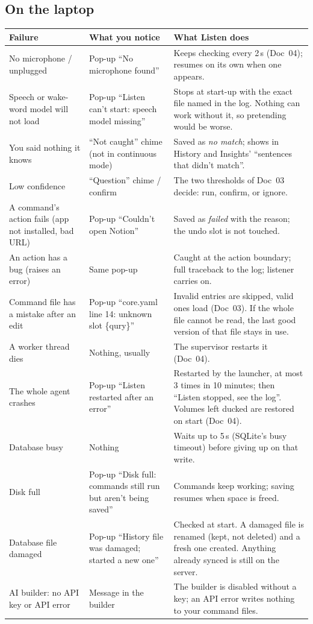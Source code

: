 \documentclass[11pt,a4paper]{article}
\begin{document}
\subsection{On the laptop}
\begin{center}
\small
\renewcommand{\arraystretch}{1.2}
\begin{tabularx}{\textwidth}{>{\raggedright\arraybackslash}p{3.3cm} >{\raggedright\arraybackslash}X >{\raggedright\arraybackslash}X}
\toprule
\textbf{Failure} & \textbf{What you notice} & \textbf{What Listen does} \\
\midrule
No microphone / unplugged & Pop-up ``No microphone found'' & Keeps checking every 2\,s (Doc~04); resumes on its own when one appears. \\
Speech or wake-word model will not load & Pop-up ``Listen can't start: speech model missing'' & Stops at start-up with the exact file named in the log. Nothing can work without it, so pretending would be worse. \\
You said nothing it knows & ``Not caught'' chime (not in continuous mode) & Saved as \emph{no match}; shows in History and Insights' ``sentences that didn't match''. \\
Low confidence & ``Question'' chime / confirm & The two thresholds of Doc~03 decide: run, confirm, or ignore. \\
A command's action fails (app not installed, bad URL) & Pop-up ``Couldn't open Notion'' & Saved as \emph{failed} with the reason; the undo slot is not touched. \\
An action has a bug (raises an error) & Same pop-up & Caught at the action boundary; full traceback to the log; listener carries on. \\
Command file has a mistake after an edit & Pop-up ``core.yaml line 14: unknown slot \{qury\}'' & Invalid entries are skipped, valid ones load (Doc~03). If the whole file cannot be read, the last good version of that file stays in use. \\
A worker thread dies & Nothing, usually & The supervisor restarts it (Doc~04). \\
The whole agent crashes & Pop-up ``Listen restarted after an error'' & Restarted by the launcher, at most 3 times in 10 minutes; then ``Listen stopped, see the log''. Volumes left ducked are restored on start (Doc~04). \\
Database busy & Nothing & Waits up to 5\,s (SQLite's busy timeout) before giving up on that write. \\
Disk full & Pop-up ``Disk full: commands still run but aren't being saved'' & Commands keep working; saving resumes when space is freed. \\
Database file damaged & Pop-up ``History file was damaged; started a new one'' & Checked at start. A damaged file is renamed (kept, not deleted) and a fresh one created. Anything already synced is still on the server. \\
AI builder: no API key or API error & Message in the builder & The builder is disabled without a key; an API error writes nothing to your command files. \\
\bottomrule
\end{tabularx}
\end{center}
\end{document}
